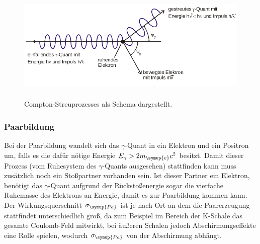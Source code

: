  \begin{figure}
   \centering
   \includegraphics[height=5.5cm]{content/Compton.png}
   \caption{Compton-Streuprozesses als Schema dargestellt.\cite{V18}}
   \label{fig:Compton}
 \end{figure}

\subsubsection{Paarbildung}
Bei der Paarbildung wandelt sich das $\gamma$-Quant in ein Elektron und ein Positron um, falls es die dafür nötige Energie $E_{\gamma}>2m_{\symup{e}}c^2$ besitzt.
Damit dieser Prozess (vom Ruhesystem des $\gamma$-Quants ausgesehen) stattfinden kann muss zusätzlich noch ein Stoßpartner vorhanden sein.
Ist dieser Partner ein Elektron, benötigt das $\gamma$-Quant aufgrund der Rückstoßenergie sogar die vierfache Ruhemasse des Elektrons an Energie, damit es zur Paarbildung kommen kann.
Der Wirkungsquerschnitt $\sigma_{\symup{Pa}}$ ist je nach Ort an dem die Paarerzeugung stattfindet unterschiedlich groß, da zum Beispiel im Bereich der K-Schale das gesamte Coulomb-Feld mitwirkt, bei äußeren Schalen
jedoch Abschirmungseffekte eine Rolle spielen, wodurch $\sigma_{\symup{Pa}}$ von der Abschirmung abhängt.
